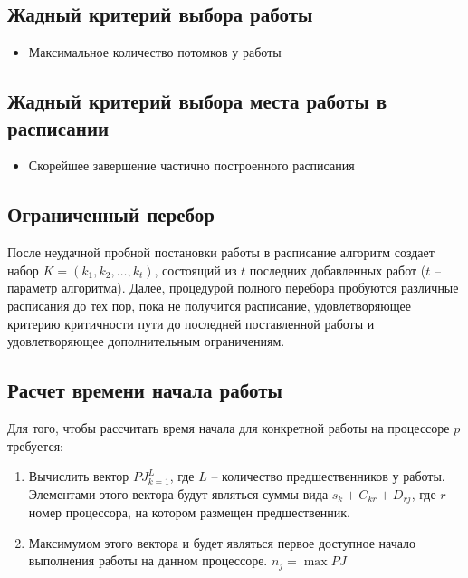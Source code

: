 \documentclass{article}
\begin{document}
\subsection{Жадный критерий выбора работы}
\begin{itemize}
    \item Максимальное количество потомков у работы
\end{itemize}
\subsection{Жадный критерий выбора места работы в расписании}
\begin{itemize}
    \item Скорейшее завершение частично построенного расписания
\end{itemize}
\subsection{Ограниченный перебор}
После неудачной пробной постановки работы в расписание алгоритм создает набор $K = \left( k_1, k_2, \dots, k_t \right)$, состоящий из $t$ последних добавленных работ ($t$ – параметр алгоритма). Далее, процедурой полного перебора пробуются различные расписания до тех пор, пока не получится расписание, удовлетворяющее критерию критичности пути до последней поставленной работы и удовлетворяющее дополнительным ограничениям.
\subsection{Расчет времени начала работы}
Для того, чтобы рассчитать время начала  для конкретной работы на процессоре $p$ требуется:
\begin{enumerate}
    \item Вычислить вектор $PJ_{k=1}^L$, где $L$ – количество предшественников у работы. Элементами этого вектора будут являться суммы вида $s_k + C_{kr} + D_{rj}$, где $r$ – номер процессора, на котором размещен предшественник. 
    \item Максимумом этого вектора и будет являться первое доступное начало выполнения работы на данном процессоре. $n_j=\max{PJ}$
\end{enumerate}
\end{document}
